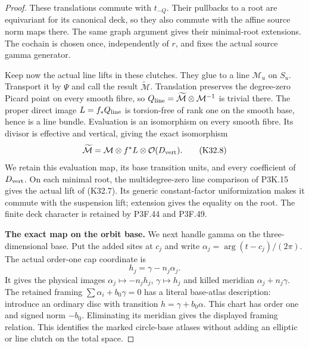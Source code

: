 \begin{proof}
These translations commute with $t_{-Q}$. Their pullbacks
to a root are equivariant for its canonical deck, so they
also commute with the affine source norm maps there.
The same graph argument gives their minimal-root extensions.
The cochain is chosen once, independently of $r$, and fixes
the actual source gamma generator.

Keep now the actual line lifts in these clutches. They glue
to a line $\mathcal M_u$ on $S_u$. Transport it by $\Psi$
and call the result $\widetilde{\mathcal M}$. Translation
preserves the degree-zero Picard point on every smooth fibre,
so $Q_{\rm line}=\widetilde{\mathcal M}\otimes\mathcal M^{-1}$
is trivial there. The proper direct image
$L=f_*Q_{\rm line}$ is torsion-free of rank one on the
smooth base, hence is a line bundle. Evaluation is an
isomorphism on every smooth fibre. Its divisor is effective
and vertical, giving the exact isomorphism
\[
 \widetilde{\mathcal M}
   =\mathcal M\otimes f^*L\otimes\mathcal O(D_{\rm vert}).
                                                               \tag{K32.8}
\]
We retain this evaluation map, its base transition units,
and every coefficient of $D_{\rm vert}$. On each minimal
root, the multidegree-zero line comparison of P3K.15 gives
the actual lift of (K32.7). Its generic constant-factor
uniformization makes it commute with the suspension lift;
extension gives the equality on the root. The finite
deck character is retained by P3F.44 and P3F.49.

\par\medskip\noindent\textbf{The exact map on the orbit base.}
We next handle gamma on the three-dimensional base. Put
the added sites at $c_j$ and write
$\alpha_j=\arg(t-c_j)/(2\pi)$. The actual order-one
cap coordinate is
\[
                      h_j=\gamma-n_j\alpha_j.           \tag{K32.9}
\]
It gives the physical images $\alpha_j\mapsto-n_jh_j$,
$\gamma\mapsto h_j$ and killed meridian
$\alpha_j+n_j\gamma$.
The retained framing $\sum\alpha_i+b_0\gamma=0$ has a
literal base-atlas description: introduce an ordinary
disc with transition $h=\gamma+b_0\alpha$. This chart
has order one and signed norm $-b_0$. Eliminating its
meridian gives the displayed framing relation. This
identifies the marked circle-base atlases without adding
an elliptic or line clutch on the total space.


\end{proof}
